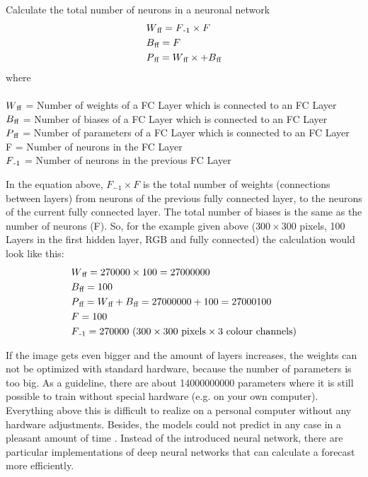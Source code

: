 \begin{definition}[label=cn]{Calculate the total number of neurons in a neuronal network}
	\begin{align*}
		& W\textsubscript{ff} = F\textsubscript{-1}\times F \\
		& B\textsubscript{ff} = F \\
		& P\textsubscript{ff} = W\textsubscript{ff}\times +  B\textsubscript{ff}
	\end{align*}
	where \\\\
	\(W\textsubscript{ff}\) = Number of weights of a FC Layer which is connected to an FC Layer \\
	\(B\textsubscript{ff}\) = Number of biases of a FC Layer which is connected to an FC Layer \\
	\(P\textsubscript{ff}\) = Number of parameters of a FC Layer which is connected to an FC Layer \\
	F = Number of neurons in the FC Layer\\
	\(F\textsubscript{-1}\) = Number of neurons in the previous FC Layer
\end{definition}

In the equation above, \( F_{-1} \times F \) is the total number of weights (connections between layers) from neurons of the previous fully connected layer, to the neurons of the current fully connected layer.  The total number of biases is the same as the number of neurons (F). So, for the example given above (\( 300 \times 300\) pixels, 100 Layers in the first hidden layer, RGB and fully connected) the calculation would look like this:\\
\begin{align*}
	& W\textsubscript{ff} =  270000 \times 100 = 27000000  \\
	& B\textsubscript{ff} = 100 \\
	& P\textsubscript{ff} = W\textsubscript{ff} +  B\textsubscript{ff} = 27000000 + 100 =27000100    \\
	& F = 100 \\
	& F\textsubscript{-1} = 270000  \text{ (300}  \times \text{300 pixels}  \times \text{3 colour channels)}\\
\end{align*}

If the image gets even bigger and the amount of layers increases, the weights can not be optimized with standard hardware, because the number of parameters is too big. As a guideline, there are about 14000000000 parameters where it is still possible to train without special hardware (e.g. on your own computer). Everything above this is difficult to realize on a personal computer without any hardware adjustments. Besides, the models could not predict in any case in a pleasant amount of time \cite{DBLP:journals/corr/TraskGR15}. Instead of the introduced neural network, there are particular implementations of deep neural networks that can calculate a forecast more efficiently.\\

